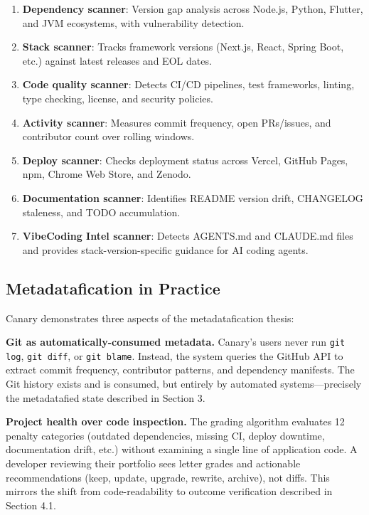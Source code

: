 \documentclass[sigconf, nonacm, anonymous=false]{acmart}
\begin{document}
\begin{enumerate}
  \item \textbf{Dependency scanner}: Version gap analysis across Node.js, Python, Flutter, and JVM ecosystems, with vulnerability detection.
  \item \textbf{Stack scanner}: Tracks framework versions (Next.js, React, Spring Boot, etc.) against latest releases and EOL dates.
  \item \textbf{Code quality scanner}: Detects CI/CD pipelines, test frameworks, linting, type checking, license, and security policies.
  \item \textbf{Activity scanner}: Measures commit frequency, open PRs/issues, and contributor count over rolling windows.
  \item \textbf{Deploy scanner}: Checks deployment status across Vercel, GitHub Pages, npm, Chrome Web Store, and Zenodo.
  \item \textbf{Documentation scanner}: Identifies README version drift, CHANGELOG staleness, and TODO accumulation.
  \item \textbf{VibeCoding Intel scanner}: Detects AGENTS.md and CLAUDE.md files and provides stack-version-specific guidance for AI coding agents.
\end{enumerate}

\subsection{Metadatafication in Practice}

Canary demonstrates three aspects of the metadatafication thesis:

\textbf{Git as automatically-consumed metadata.} Canary's users never run \texttt{git log}, \texttt{git diff}, or \texttt{git blame}. Instead, the system queries the GitHub API to extract commit frequency, contributor patterns, and dependency manifests. The Git history exists and is consumed, but entirely by automated systems---precisely the metadatafied state described in Section 3.

\textbf{Project health over code inspection.} The grading algorithm evaluates 12 penalty categories (outdated dependencies, missing CI, deploy downtime, documentation drift, etc.) without examining a single line of application code. A developer reviewing their portfolio sees letter grades and actionable recommendations (keep, update, upgrade, rewrite, archive), not diffs. This mirrors the shift from code-readability to outcome verification described in Section 4.1.
\end{document}
